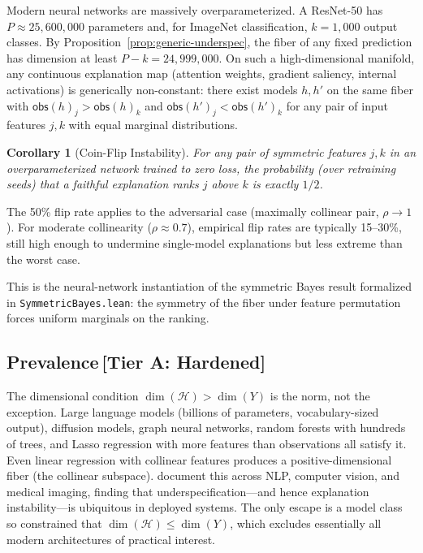 \documentclass[11pt,a4paper]{article}
\newtheorem{corollary}[theorem]{Corollary}
\newcommand{\sH}{\mathcal{H}}
\begin{document}
Modern neural networks are massively overparameterized.  A ResNet-50 has
$P \approx 25{,}600{,}000$ parameters and, for ImageNet classification,
$k = 1{,}000$ output classes.  By Proposition~\ref{prop:generic-underspec},
the fiber of any fixed prediction has dimension at least
$P - k = 24{,}999{,}000$.  On such a high-dimensional manifold, any
continuous explanation map (attention weights, gradient saliency, internal
activations) is generically non-constant: there exist models $h, h'$ on the
same fiber with $\mathsf{obs}(h)_j > \mathsf{obs}(h)_k$ and
$\mathsf{obs}(h')_j < \mathsf{obs}(h')_k$ for any pair of input features
$j, k$ with equal marginal distributions.

\begin{corollary}[Coin-Flip Instability]
\label{cor:coin-flip}
For any pair of symmetric features $j, k$ in an overparameterized network
trained to zero loss, the probability (over retraining seeds) that a
faithful explanation ranks $j$ above $k$ is exactly $1/2$.
\end{corollary}

\noindent
The 50\% flip rate applies to the adversarial case (maximally collinear pair, $\rho \to 1$). For moderate collinearity ($\rho \approx 0.7$), empirical flip rates are typically 15--30\%, still high enough to undermine single-model explanations but less extreme than the worst case.

\noindent
This is the neural-network instantiation of the symmetric Bayes
result formalized in \texttt{Symmetric\-Bayes.lean}: the symmetry
of the fiber under feature permutation forces uniform marginals on
the ranking.

\subsection{Prevalence\,\textnormal{\normalsize[Tier A: Hardened]}}
\label{sec:prevalence}

The dimensional condition $\dim(\sH) > \dim(Y)$ is the norm, not the
exception.  Large language models (billions of parameters, vocabulary-sized
output), diffusion models, graph neural networks, random forests with
hundreds of trees, and Lasso regression with more features than observations
all satisfy it.  Even linear regression with collinear features produces a
positive-dimensional fiber (the collinear subspace).
\citet{damour2022underspecification} document this across NLP,
computer vision, and medical imaging, finding that
underspecification---and hence explanation instability---is ubiquitous
in deployed systems.  The only escape is a model class so constrained
that $\dim(\sH) \leq \dim(Y)$, which excludes essentially all modern
architectures of practical interest.
\end{document}

